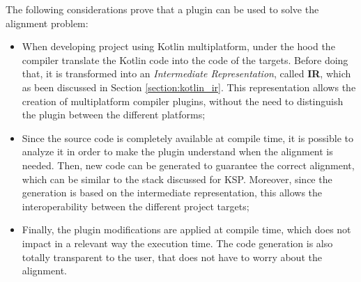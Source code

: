 The following considerations prove that a plugin can be used to solve the alignment problem:
\begin{itemize}
    \item When developing project using Kotlin multiplatform, under the hood the compiler translate the Kotlin code into the code of the targets. Before doing that, it is transformed into an \textit{Intermediate Representation}, called \textbf{IR}, which as been discussed in Section \ref{section:kotlin_ir}. This representation allows the creation of multiplatform compiler plugins, without the need to distinguish the plugin between the different platforms;
    \item Since the source code is completely available at compile time, it is possible to analyze it in order to make the plugin understand when the alignment is needed. Then, new code can be generated to guarantee the correct alignment, which can be similar to the stack discussed for KSP. Moreover, since the generation is based on the intermediate representation, this allows the interoperability between the different project targets;
    \item Finally, the plugin modifications are applied at compile time, which does not impact in a relevant way the execution time. The code generation is also totally transparent to the user, that does not have to worry about the alignment.
\end{itemize}

